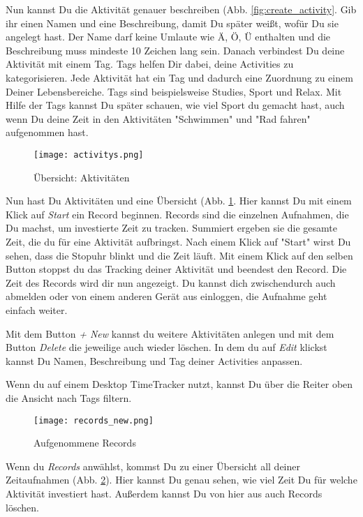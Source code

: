 Nun kannst Du die Aktivität genauer beschreiben (Abb. \ref{fig:create_activity}. 
Gib ihr einen Namen und eine Beschreibung, damit Du später weißt, wofür Du sie angelegt hast. 
Der Name darf keine Umlaute wie \glqq Ä, Ö, Ü\grqq{}  enthalten und die Beschreibung muss mindeste 10 Zeichen lang sein. 
Danach verbindest Du deine Aktivität mit einem Tag. Tags helfen Dir dabei, deine Activities zu kategorisieren.
Jede Aktivität hat ein Tag und dadurch eine Zuordnung zu einem Deiner Lebensbereiche. 
Tags sind beispielsweise Studies, Sport und Relax. 
Mit Hilfe der Tags kannst Du später schauen, wie viel Sport du gemacht hast, auch wenn Du deine Zeit in den Aktivitäten "Schwimmen" und "Rad fahren" aufgenommen hast. 


\begin{figure}[H]
	\hspace{-1.5cm}
	\centering
	\texttt{[image: activitys.png]}
	\caption{Übersicht: Aktivitäten}
	\label{fig:activitys}
\end{figure}

Nun hast Du Aktivitäten und eine Übersicht (Abb. \ref{fig:activitys}. Hier kannst Du mit einem Klick auf  \textit{Start} ein Record beginnen. Records sind die einzelnen Aufnahmen, die Du machst, um investierte Zeit zu tracken. Summiert ergeben sie die gesamte Zeit, die du für eine Aktivität aufbringst. Nach einem Klick auf "Start" wirst Du sehen, dass die Stopuhr blinkt und die Zeit läuft. 
Mit einem Klick auf den selben Button stoppst du das Tracking deiner Aktivität und beendest den Record. Die Zeit des Records wird dir nun angezeigt.
Du kannst dich zwischendurch auch abmelden oder von einem anderen Gerät aus einloggen, die Aufnahme geht einfach weiter. 

Mit dem Button \textit{+ New} kannst du weitere Aktivitäten anlegen und mit dem Button \textit{Delete} die jeweilige auch wieder löschen. In dem du auf \textit{Edit} klickst kannst Du Namen, Beschreibung und Tag deiner Activities anpassen.

Wenn du auf einem Desktop TimeTracker nutzt, kannst Du über die Reiter oben die Ansicht nach Tags filtern. 

\begin{figure}[H]
	\hspace{-1.5cm}
	\centering
	\texttt{[image: records\_new.png]}
	\caption{Aufgenommene Records}
	\label{fig:records}
\end{figure}

Wenn du \textit{Records} anwählst, kommst Du zu einer Übersicht all deiner Zeitaufnahmen (Abb. \ref{fig:records}). Hier kannst Du genau sehen, wie viel Zeit Du für welche Aktivität investiert hast. Außerdem kannst Du von hier aus auch Records löschen.

